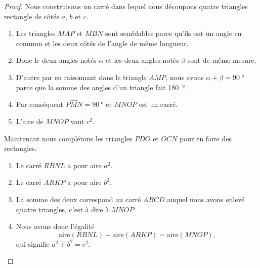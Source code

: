 \begin{proof}

    Nous construisons un carré dans lequel nous découpons quatre triangles rectangle de côtés \( a\), \( b\) et \( c\).
    
\begin{center}
   
\end{center}

\begin{enumerate}
    \item
        
        Les triangles \( MAP\) et \( MBN\) sont semblables parce qu'ils ont un angle en commun et les deux côtés de l'angle de même longueur.
    \item
        Donc le deux angles notés \( \alpha\) et les deux angles notés \( \beta\) sont de même mesure.
    \item
        D'autre par en raisonnant dans le triangle \( AMP\), nous avons \( \alpha+\beta=\SI{90}{\degree}\) parce que la somme des angles d'un triangle fait \SI{180}{\degree}.
    \item
        Par conséquent \( \widehat{PMN}=\SI{90}{\degree}\) et \( MNOP\) est un carré.
    \item
        L'aire de \( MNOP\) vaut \( c^2\).

\end{enumerate}

Maintenant nous complétons les triangles \( PDO\) et \( OCN\) pour en faire des rectangles.

\begin{center}
   
\end{center}

\begin{enumerate}
    \item
        Le carré \( RBNL\) a pour aire \( a^2\).
    \item
        Le carré \( ARKP\) a pour aire \( b^2\).
    \item
        La somme des deux correspond au carré \( ABCD\) auquel nous avons enlevé quatre triangles, c'est à dire à \( MNOP\).
    \item
        Nous avons donc l'égalité
        \begin{equation}
            \text{aire}(RBNL)+\text{aire}(ARKP)=\text{aire}(MNOP),
        \end{equation}
        qui signifie \( a^2+b^2=c^2\).
\end{enumerate}

\end{proof}


